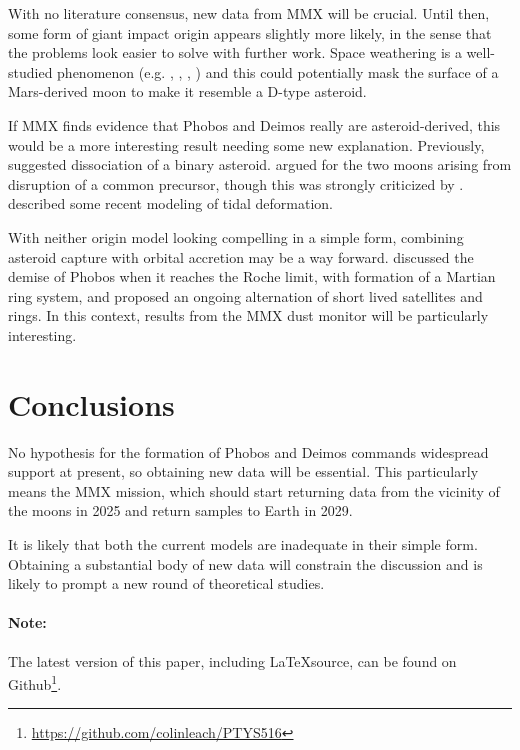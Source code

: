 With no literature consensus, new data from MMX will be crucial. Until then, some form of giant impact origin appears slightly more likely, in the sense that the problems look easier to solve with further work. Space weathering is a well-studied phenomenon (e.g. \citet{gaffey_space_2010}, \citet{cipriani_model_2011}, \citet{pieters_composition_2014}, \citet{brunetto_asteroid_2015}) and this could potentially mask the surface of a Mars-derived moon to make it resemble a D-type asteroid.
 
If MMX finds evidence that Phobos and Deimos really are asteroid-derived, this would be a more interesting result needing some new explanation. Previously, \citet{landis_origin_nodate} suggested dissociation of a binary asteroid. \citet{bagheri_dynamical_2021} argued for the two moons arising from disruption of a common precursor, though this was strongly criticized by \citet{hyodo_challenges_2022}. \citet{dmitrovskii_constraints_2022} described some recent modeling of tidal deformation. 

With neither origin model looking compelling in a simple form, combining asteroid capture with orbital accretion may be a way forward. \citet{black_demise_2015} discussed the demise of Phobos when it reaches the Roche limit, with formation of a Martian ring system, and \citet{hesselbrock_ongoing_2017} proposed an ongoing alternation of short lived satellites and rings. In this context, results from the MMX dust monitor will be particularly interesting.


\section{Conclusions}\label{section:conclusions}

No hypothesis for the formation of Phobos and Deimos commands widespread support at present, so obtaining new data will be essential. This particularly means the MMX mission, which should start returning data from the vicinity of the moons in 2025 and return samples to Earth in 2029.

It is likely that both the current models are inadequate in their simple form. Obtaining a substantial body of new data will constrain the discussion and is likely to prompt a new round of theoretical studies.

\paragraph{Note:} The latest version of this paper, including \LaTeX source, can be found on Github\footnote{\href{https://github.com/colinleach/PTYS516}{https://github.com/colinleach/PTYS516}}.

